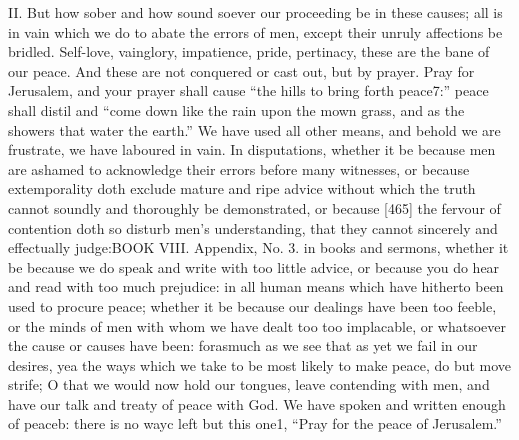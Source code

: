 II. But how sober and how sound soever our proceeding be in these causes; all is in vain which we do to abate the errors of men, except their unruly affections be bridled. Self-love, vainglory, impatience, pride, pertinacy, these are the bane of our peace. And these are not conquered or cast out, but by prayer. Pray for Jerusalem, and your prayer shall cause “the hills to bring forth peace7:” peace shall distil and “come down like the rain upon the mown grass, and as the showers that water the earth.” We have used all other means, and behold we are frustrate, we have laboured in vain. In disputations, whether it be because men are ashamed to acknowledge their errors before many witnesses, or because extemporality doth exclude mature and ripe advice without which the truth cannot soundly and thoroughly be demonstrated, or because [465] the fervour of contention doth so disturb men’s understanding, that they cannot sincerely and effectually judge:BOOK VIII. Appendix, No. 3. in books and sermons, whether it be because we do speak and write with too little advice, or because you do hear and read with too much prejudice: in all human means which have hitherto been used to procure peace; whether it be because our dealings have been too feeble, or the minds of men with whom we have dealt too too implacable, or whatsoever the cause or causes have been: forasmuch as we see that as yet we fail in our desires, yea the ways which we take to be most likely to make peace, do but move strife; O that we would now hold our tongues, leave contending with men, and have our talk and treaty of peace with God. We have spoken and written enough of peaceb: there is no wayc left but this one1, “Pray for the peace of Jerusalem.”

